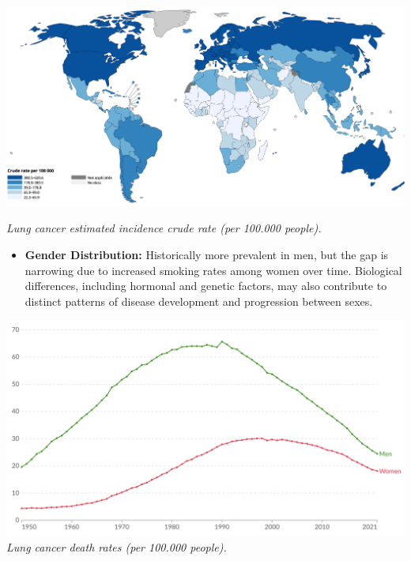 \vspace{1em}
\begin{center}
    \includegraphics[width=1.00\textwidth]{../assets/01-overview/lc-crude-rate.png}

    \small\textit{Lung cancer estimated incidence crude rate (per 100.000 people). \cite{who2024}}
\end{center}
\vspace{1em}

\begin{itemize}
    \item \textbf{Gender Distribution:} Historically more prevalent in men, but the gap is narrowing 
    due to increased smoking rates among women over time. Biological differences, including hormonal 
    and genetic factors, may also contribute to distinct patterns of disease development and 
    progression between sexes.
\end{itemize}

\vspace{1em}
\begin{center}
    \includegraphics[width=1.00\textwidth]{../assets/01-overview/lc-death-men-vs-women.png}
    \small\textit{Lung cancer death rates (per 100.000 people). \cite{ourworldindata, who2024}}
\end{center}
\vspace{1em}

